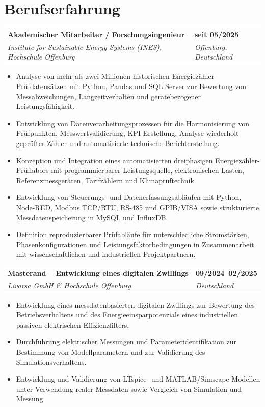 \documentclass[10pt,a4paper]{article}
\makeatletter
\newcommand{\entry}[4]{\begin{tabularx}{\textwidth}{@{}X>{\raggedleft\arraybackslash}p{3.1cm}@{}}\textbf{#1} & \textbf{#2}\\\textit{#3} & \textit{#4}\end{tabularx}\vspace{1pt}}
\makeatother
\begin{document}
\section{Berufserfahrung}
\entry{Akademischer Mitarbeiter / Forschungsingenieur}{seit 05/2025}{Institute for Sustainable Energy Systems (INES), Hochschule Offenburg}{Offenburg, Deutschland}
\begin{itemize}
\item Analyse von mehr als zwei Millionen historischen Energiezähler-Prüfdatensätzen mit Python, Pandas und SQL Server zur Bewertung von Messabweichungen, Langzeitverhalten und gerätebezogener Leistungsfähigkeit.
\item Entwicklung von Datenverarbeitungsprozessen für die Harmonisierung von Prüfpunkten, Messwertvalidierung, KPI-Erstellung, Analyse wiederholt geprüfter Zähler und automatisierte technische Berichterstellung.
\item Konzeption und Integration eines automatisierten dreiphasigen Energiezähler-Prüflabors mit programmierbarer Leistungsquelle, elektronischen Lasten, Referenzmessgeräten, Tarifzählern und Klimaprüftechnik.
\item Entwicklung von Steuerungs- und Datenerfassungsabläufen mit Python, Node-RED, Modbus TCP/RTU, RS-485 und GPIB/VISA sowie strukturierte Messdatenspeicherung in MySQL und InfluxDB.
\item Definition reproduzierbarer Prüfabläufe für unterschiedliche Stromstärken, Phasenkonfigurationen und Leistungsfaktorbedingungen in Zusammenarbeit mit wissenschaftlichen und industriellen Projektpartnern.
\end{itemize}

\entry{Masterand -- Entwicklung eines digitalen Zwillings}{09/2024--02/2025}{Livarsa GmbH \& Hochschule Offenburg}{Deutschland}
\begin{itemize}
\item Entwicklung eines messdatenbasierten digitalen Zwillings zur Bewertung des Betriebsverhaltens und des Energieeinsparpotenzials eines industriellen passiven elektrischen Effizienzfilters.
\item Durchführung elektrischer Messungen und Parameteridentifikation zur Bestimmung von Modellparametern und zur Validierung des Simulationsverhaltens.
\item Entwicklung und Validierung von LTspice- und MATLAB/Simscape-Modellen unter Verwendung realer Messdaten sowie Vergleich von Simulation und Messung.
\end{itemize}
\end{document}
